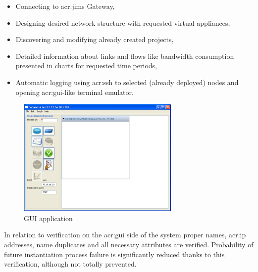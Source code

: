 \documentclass[11pt,openany]{book}
\begin{document}
        \begin{itemize}
          \item Connecting to \gls{acr:jims} Gateway,
          \item Designing desired network structure with requested virtual appliances,
          \item Discovering and modifying already created projects,
          \item Detailed information about links and flows like bandwidth consumption presented in charts for requested
                time periods,
          \item Automatic logging using \gls{acr:ssh} to selected (already deployed) nodes and opening
                \gls{acr:gui}-like terminal emulator.
        \end{itemize}

        \begin{figure}[H]
          \centering
          \includegraphics[width=0.7\textwidth]{img/impl/gui.png}

          \caption{GUI application}
        \end{figure}

        In relation to verification on the \gls{acr:gui} side of the system proper names, \gls{acr:ip} addresses, name
        duplicates and all necessary attributes are verified. Probability of future instantiation process failure is
        significantly reduced thanks to this verification, although not totally prevented.
\end{document}
